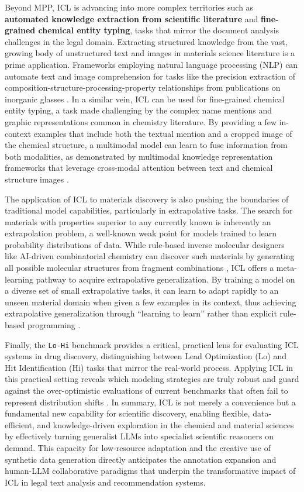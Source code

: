 \documentclass[11pt]{article}
\begin{document}
Beyond MPP, ICL is advancing into more complex territories such as \textbf{automated knowledge extraction from scientific literature} and \textbf{fine-grained chemical entity typing}, tasks that mirror the document analysis challenges in the legal domain. Extracting structured knowledge from the vast, growing body of unstructured text and images in materials science literature is a prime application. Frameworks employing natural language processing (NLP) can automate text and image comprehension for tasks like the precision extraction of composition-structure-processing-property relationships from publications on inorganic glasses \cite{ref563}. In a similar vein, ICL can be used for fine-grained chemical entity typing, a task made challenging by the complex name mentions and graphic representations common in chemistry literature. By providing a few in-context examples that include both the textual mention and a cropped image of the chemical structure, a multimodal model can learn to fuse information from both modalities, as demonstrated by multimodal knowledge representation frameworks that leverage cross-modal attention between text and chemical structure images \cite{ref564}.

The application of ICL to materials discovery is also pushing the boundaries of traditional model capabilities, particularly in extrapolative tasks. The search for materials with properties superior to any currently known is inherently an extrapolation problem, a well-known weak point for models trained to learn probability distributions of data. While rule-based inverse molecular designers like AI-driven combinatorial chemistry can discover such materials by generating all possible molecular structures from fragment combinations \cite{ref565}, ICL offers a meta-learning pathway to acquire extrapolative generalization. By training a model on a diverse set of small extrapolative tasks, it can learn to adapt rapidly to an unseen material domain when given a few examples in its context, thus achieving extrapolative generalization through ``learning to learn'' rather than explicit rule-based programming \cite{ref566}.

Finally, the \texttt{Lo-Hi} benchmark provides a critical, practical lens for evaluating ICL systems in drug discovery, distinguishing between Lead Optimization (Lo) and Hit Identification (Hi) tasks that mirror the real-world process. Applying ICL in this practical setting reveals which modeling strategies are truly robust and guard against the over-optimistic evaluations of current benchmarks that often fail to represent distribution shifts \cite{ref567}. In summary, ICL is not merely a convenience but a fundamental new capability for scientific discovery, enabling flexible, data-efficient, and knowledge-driven exploration in the chemical and material sciences by effectively turning generalist LLMs into specialist scientific reasoners on demand. This capacity for low-resource adaptation and the creative use of synthetic data generation directly anticipates the annotation expansion and human-LLM collaborative paradigms that underpin the transformative impact of ICL in legal text analysis and recommendation systems.
\end{document}
